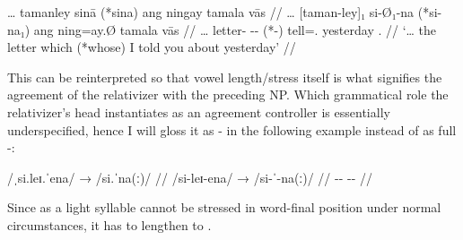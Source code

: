 \ex\begingl
	\gla … tamanley sinā (*sina) ang ningay tamala vās //
	\glb … [taman-ley]₁ si-Ø₁-na (*si-na₁) ang ning=ay.Ø tamala vās //
	\glc … letter-\PargI{} \Rel{}-\PatTI{}-\Gen{} (*\Rel{}-\Gen{}) \AgtT{} 
		tell=\Fsg{}.\Top{} yesterday \Ssg{}.\Parg{} //
	\glft `… the letter which (*whose) I told you about yesterday' //
\endgl\xe

This can be reinterpreted so that vowel length/stress itself is what signifies 
the agreement of the relativizer with the preceding NP. Which grammatical role 
the relativizer's head instantiates as an agreement controller is essentially 
underspecified, hence I will gloss it as -\Agr{} in the following example 
instead of as full -\PargI{}:

\ex[everygla=\upshape]\begingl
	\gla /ˌsi.leɪ.ˈena/ → /si.ˈna(ː)/ //
	\glb /si-leɪ-ena/ → /si-ˈ-na(ː)/ //
	\glc \Rel{}-\PargI{}-\Gen{} {} \Rel{}-\Agr{}-\Gen{} //
\endgl\xe

Since  as a light syllable cannot be stressed in word-final 
position under normal circumstances, it has to lengthen to .


